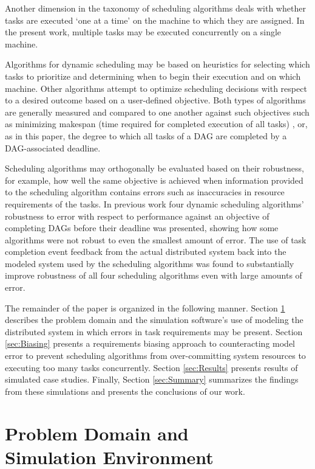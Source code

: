 \documentclass[10pt]{csce}
\begin{document}
Another dimension in the taxonomy of scheduling algorithms deals with whether
tasks are executed `one at a time' on the machine to which they are assigned.
In the present work, multiple tasks may be executed concurrently on a single
machine.

Algorithms for dynamic scheduling may be based on heuristics for selecting
which tasks to prioritize and determining when to begin their execution and on
which machine. Other algorithms attempt to optimize scheduling decisions with
respect to a desired outcome based on a user-defined objective.  Both types of
algorithms are generally measured and compared to one another against such
objectives such as minimizing makespan (time required for completed execution
of all tasks) \cite{stochastic}, or, as in this paper, the degree to which all
tasks of a DAG are completed by a DAG-associated deadline.

Scheduling algorithms may orthogonally be evaluated based on their robustness,
for example, how well the same objective is achieved when information provided
to the scheduling algorithm contains errors such as inaccuracies in resource
requirements of the tasks.  In previous work \cite{pdpta18} four dynamic
scheduling algorithms' robustness to error with respect to performance against
an objective of completing DAGs before their deadline was presented, showing
how some algorithms were not robust to even the smallest amount of error. The
use of task completion event feedback from the actual distributed system back
into the modeled system used by the scheduling algorithms was found to
substantially improve robustness of all four scheduling algorithms even with
large amounts of error.

The remainder of the paper is organized in the following manner.  Section
\ref{sec:Framework} describes the problem domain and the simulation software's
use of modeling the distributed system in which errors in task requirements may
be present.  Section \ref{sec:Biasing} presents a requirements biasing approach
to counteracting model error to prevent scheduling algorithms from
over-committing system resources to executing too many tasks concurrently.
Section \ref{sec:Results} presents results of simulated case studies.
Finally, Section \ref{sec:Summary} summarizes the findings from these
simulations and presents the conclusions of our work.


\section{Problem Domain and \\
Simulation Environment}
\label{sec:Framework}
\end{document}

